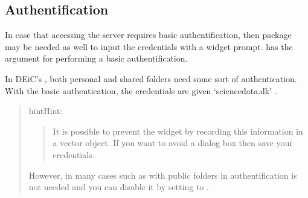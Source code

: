 \documentclass[a4paper,12pt,english]{sphinxhowto}
\begin{document}
\subsection{Authentification}
\label{\detokenize{Sciencedata_dk:authentification}}
In case that accessing the server requires basic authentification,
then package  may be needed as well to input the credentials with a widget prompt.
 has the  argument for performing a basic authentification.

In DEiC’s , both personal and shared folders
need some sort of authentication. With the basic authentication, the credentials are given
 ‘sciencedata.dk’ .
\begin{quote}

\begin{sphinxadmonition}{hint}{Hint:}\begin{quote}

It is possible to prevent the widget by recording this information in a vector object.
If you want to avoid a dialog box then save your credentials.

\begin{sphinxVerbatim}[commandchars=\\\{\},formatcom=\footnotesize]
    
\end{sphinxVerbatim}
\end{quote}

However, in many cases such as with public folders in 
authentification        is not needed and you can disable it by setting  to
.
\end{sphinxadmonition}
\end{quote}

\end{document}
